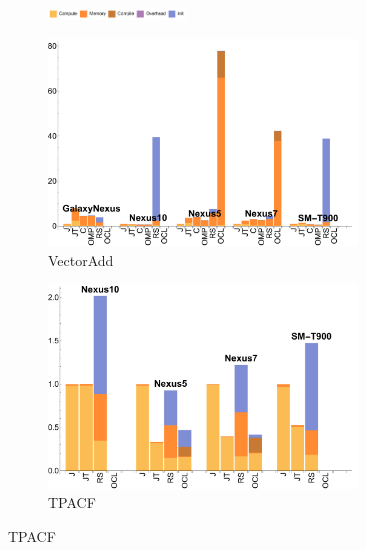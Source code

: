 \begin{figure}[ht]

  \begin{subfigure}[b]{\textwidth}
          \centering
          \includegraphics[width=0.4\textwidth]{data/legend.pdf}
  \end{subfigure}

  \begin{subfigure}[b]{0.5\textwidth}
      \centering
      \includegraphics[width=0.9\textwidth]{data/VectorAdd_onecompute_time.pdf}
      \caption{VectorAdd}\label{fig:vectoradd}
  \end{subfigure}
  \begin{subfigure}[b]{0.5\textwidth}
      \centering
      \includegraphics[width=0.9\textwidth]{data/Tpacf_onecompute_time.pdf}
      \caption{TPACF}
      \label{fig:TPACF}
  \end{subfigure}


\end{figure}
